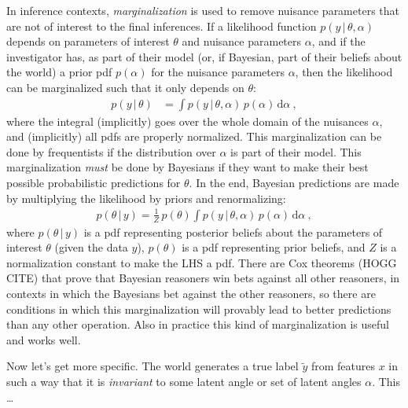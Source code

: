\documentclass{article}
\newcommand{\dd}{\mathrm{d}}
\newcommand{\given}{\,|\,}
\begin{document}
In inference contexts, \emph{marginalization} is used to remove nuisance parameters that are not of interest to the final inferences.
If a likelihood function $p(y\given\theta,\alpha)$ depends on parameters of interest $\theta$ and nuisance parameters $\alpha$, and if the investigator has, as part of their model (or, if Bayesian, part of their beliefs about the world) a prior pdf $p(\alpha)$ for the nuisance parameters $\alpha$, then the likelihood can be marginalized such that it only depends on $\theta$:
\begin{align}
    p(y\given\theta) &= \int p(y\given\theta,\alpha)\,p(\alpha)\,\dd\alpha ~,
\end{align}
where the integral (implicitly) goes over the whole domain of the nuisances $\alpha$, and (implicitly) all pdfs are properly normalized.
This marginalization can be done by frequentists if the distribution over $\alpha$ is part of their model.
This marginalization \emph{must} be done by Bayesians if they want to make their best possible probabilistic predictions for $\theta$.
In the end, Bayesian predictions are made by multiplying the likelihood by priors and renormalizing:
\begin{align}
    p(\theta\given y) = \frac{1}{Z}\,p(\theta)\int p(y\given\theta,\alpha)\,p(\alpha)\,\dd\alpha ~,
\end{align}
where $p(\theta\given y)$ is a pdf representing posterior beliefs about the parameters of interest $\theta$ (given the data $y$),
$p(\theta)$ is a pdf representing prior beliefs,
and $Z$ is a normalization constant to make the LHS a pdf.
There are Cox theorems (HOGG CITE) that prove that Bayesian reasoners win bets against all other reasoners, in contexts in which the Bayesians bet against the other reasoners, so there are conditions in which this marginalization will provably lead to better predictions than any other operation.
Also in practice this kind of marginalization is useful and works well.

Now let's get more specific.
The world generates a true label $\tilde{y}$ from features $x$ in such a way that it is \emph{invariant} to some latent angle or set of latent angles $\alpha$.
This \ldots
\end{document}
